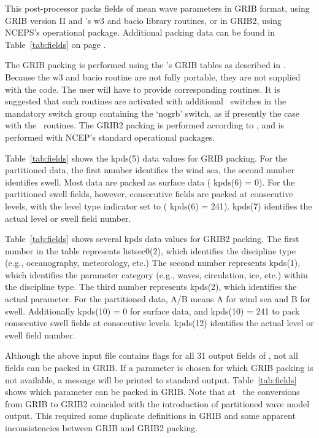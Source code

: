 
\vspace{\baselineskip} 
\noindent
This post-processor packs fields of mean wave parameters in GRIB format, using
GRIB version II and \ncep's w3 and bacio library routines, or in GRIB2, using
NCEPS's operational package. Additional packing data can be found in
Table~\ref{tab:fields} on page \pageref{tab:fields}.

The GRIB packing is performed using the \ncep's GRIB tables as described in
\cite{rep:GRIB}. Because the w3 and bacio routine are not fully portable, they
are not supplied with the code. The user will have to provide corresponding
routines. It is suggested that such routines are activated with additional
\ws\ switches in the mandatory switch group containing the `{\F nogrb}'
switch, as if presently the case with the \ncep\ routines.  The GRIB2 packing
is performed according to \cite{rep:GRIB2}, and is performed with NCEP's
standard operational packages.

Table~\ref{tab:fields} shows the {\F kpds(5)} data values for GRIB
packing. For the partitioned data, the first number identifies the wind sea,
the second number identifies swell. Most data are packed as surface data ({\F
kpds(6) = 0}). For the partitioned swell fields, however, consecutive fields
are packed at consecutive levels, with the level type indicator set to ({\F
kpds(6) = 241}). {\F kpds(7)} identifies the actual level or swell field
number.

Table~\ref{tab:fields} shows several {\F kpds} data values for GRIB2
packing. The first number in the table represents {\F listsec0(2)}, which
identifies the discipline type (e.g., oceanography, meteorology, etc.)  The
second number represents {\F kpds(1)}, which identifies the parameter category
(e.g., waves, circulation, ice, etc.) within the discipline type.  The third
number represents {\F kpds(2)}, which identifies the actual parameter.  For
the partitioned data, A/B means A for wind sea and B for swell.  Additionally
{\F kpds(10) = 0} for surface data, and {\F kpds(10) = 241 } to pack
consecutive swell fields at consecutive levels. {\F kpds(12)} identifies the
actual level or swell field number.

Although the above input file contains flags for all 31 output fields of \ws,
not all fields can be packed in GRIB. If a parameter is chosen for which GRIB
packing is not available, a message will be printed to standard
output. Table~\ref{tab:fields} shows which parameter can be packed in GRIB.
Note that at \ncep\ the conversions from GRIB to GRIB2 coincided with the
introduction of partitioned wave model output. This required some duplicate
definitions in GRIB and some apparent inconsistencies between GRIB and GRIB2
packing.


